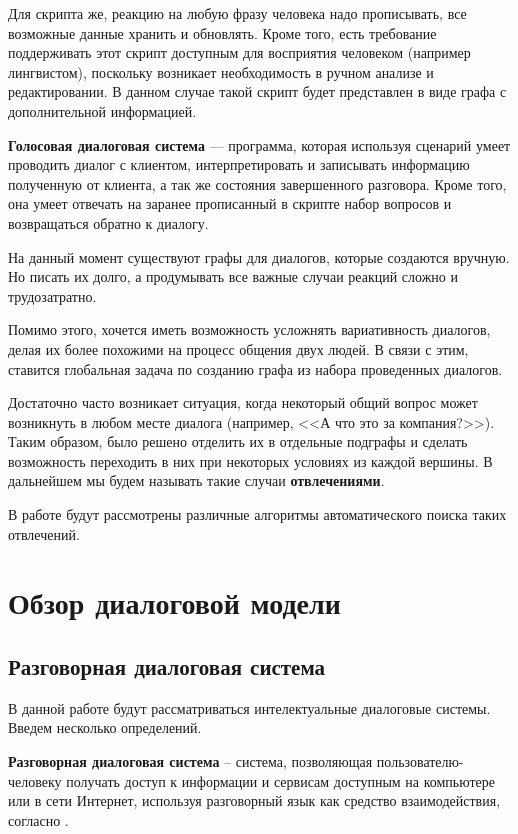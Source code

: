 \documentclass[times,specification,annotation]{itmo-student-thesis}
\begin{document}
	Для скрипта же, реакцию на любую фразу человека надо прописывать, все возможные данные хранить и обновлять. Кроме того, есть требование поддерживать этот скрипт доступным для восприятия человеком (например лингвистом), поскольку возникает необходимость в ручном анализе и редактировании. В данном случае такой скрипт будет представлен в виде графа с дополнительной информацией.
	
	\textbf{Голосовая диалоговая система} — программа, которая используя сценарий умеет проводить диалог с клиентом, интерпретировать и записывать  информацию полученную от клиента, а так же состояния завершенного разговора. Кроме того, она умеет отвечать на заранее прописанный в скрипте набор вопросов и возвращаться обратно к диалогу.
	
	На данный момент существуют графы для диалогов, которые создаются вручную. Но писать их долго, а продумывать все важные случаи реакций сложно и трудозатратно. 
	
	Помимо этого, хочется иметь возможность усложнять вариативность диалогов, делая их более похожими на процесс общения двух людей. В связи с этим, ставится глобальная задача по созданию графа из набора проведенных диалогов. 
	
	Достаточно часто возникает ситуация, когда некоторый общий вопрос может возникнуть в любом месте диалога (например, <<А что это за компания?>>). Таким образом, было решено отделить их в отдельные подграфы и сделать возможность переходить в них при некоторых условиях из каждой вершины. В дальнейшем мы будем называть такие случаи \textbf{отвлечениями}.
	
	В работе будут рассмотрены различные алгоритмы автоматического поиска таких отвлечений.
	
	\chapter{Обзор диалоговой модели}
	\section{Разговорная диалоговая система}
	В данной работе будут рассматриваться интелектуальные диалоговые системы. Введем несколько определений.
	
	\textbf{Разговорная диалоговая система} -- система, позволяющая пользователю-человеку получать доступ к информации и сервисам доступным на компьютере или в сети Интернет, используя разговорный язык как средство взаимодействия, согласно \cite{jokinen2010spoken}.
	
\end{document}
